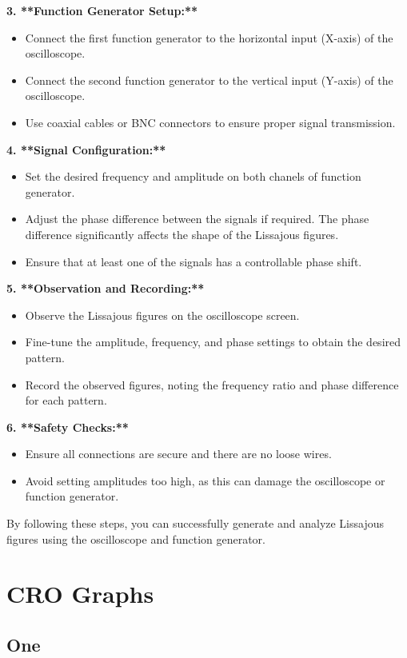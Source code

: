 \documentclass[12pt,a4paper]{report}
\begin{document}
 \textbf{3. **Function Generator Setup:**}
\begin{itemize}
    \item Connect the first function generator to the horizontal input (X-axis) of the oscilloscope.
   \item Connect the second function generator to the vertical input (Y-axis) of the oscilloscope.
   \item Use coaxial cables or BNC connectors to ensure proper signal transmission.
\end{itemize}
 \textbf{4. **Signal Configuration:**}
\begin{itemize}
   \item  Set the desired frequency and amplitude on both chanels of function generator.
   \item Adjust the phase difference between the signals if required. The phase difference significantly affects the shape of the Lissajous figures.
   \item Ensure that at least one of the signals has a controllable phase shift.
\end{itemize}


 \textbf{5. **Observation and Recording:**}
 \begin{itemize}
    \item  Observe the Lissajous figures on the oscilloscope screen.
    \item  Fine-tune the amplitude, frequency, and phase settings to obtain the desired pattern.
    \item  Record the observed figures, noting the frequency ratio and phase difference for each pattern.
\end{itemize}
 \textbf{6. **Safety Checks:**}
 \begin{itemize}
    \item Ensure all connections are secure and there are no loose wires.
    \item  Avoid setting amplitudes too high, as this can damage the oscilloscope or function generator.
\end{itemize}
By following these steps, you can successfully generate and analyze Lissajous figures using the oscilloscope and function generator.

\section{CRO Graphs}
\subsection{One}
\end{document}

